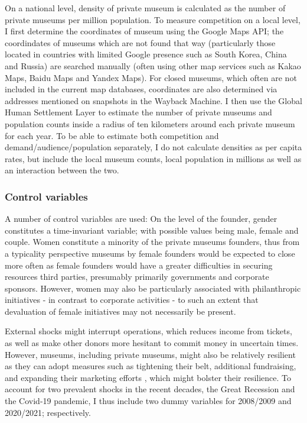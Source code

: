 \documentclass[12pt]{article}
\begin{document}
On a national level, density of private museum is calculated as the number of private museums per million population.
To measure competition on a local level, I first determine the coordinates of museum using the Google Maps API; the coordindates of museums which are not found that way (particularly those located in countries with limited Google presence such as South Korea, China and Russia) are searched manually (often using other map services such as Kakao Maps, Baidu Maps and Yandex Maps).
For closed museums, which often are not included in the current map databases, coordinates are also determined via addresses mentioned on snapshots in the Wayback Machine.
I then use the Global Human Settlement Layer \parencite{EC_2023_GHSL} to estimate the number of private museums and population counts inside a radius of ten kilometers around each private museum for each year.
To be able to estimate both competition and demand/audience/population separately, I do not calculate densities as per capita rates, but include the local museum counts, local population in millions as well as an interaction between the two.
\subsubsection*{Control variables}


\bigbreak
\noindent
A number of control variables are used: 
On the level of the founder, gender constitutes a time-invariant variable; with possible values being male, female and couple.
Women constitute a minority of the private museums founders, thus from a typicality perspective \parencite{Rosch_1975_family} museums by female founders would be expected to close more often as female founders would have a greater difficulties in securing resources third parties, presumably primarily governments and corporate sponsors.
However, women may also be particularly associated with philanthropic initiatives - in contrast to corporate activities \parencite{Milam_2013_artgirls} - to such an extent that devaluation of female initiatives may not necessarily be present.

External shocks might interrupt operations, which reduces income from tickets, as well as make other donors more hesitant to commit money in uncertain times.
However, museums, including private museums, might also be relatively resilient as they can adopt measures such as tightening their belt, additional fundraising, and expanding their marketing efforts \parencite{Geller_Salamon_2010_resilience}, which might bolster their resilience.
To account for two prevalent shocks in the recent decades, the Great Recession and the Covid-19 pandemic, I thus include two dummy variables for 2008/2009 and 2020/2021; respectively.
\end{document}
